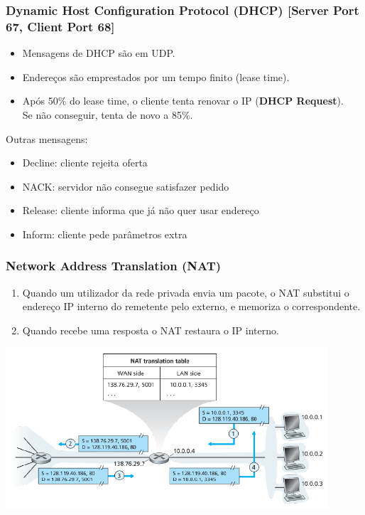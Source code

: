 \documentclass[12pt]{article}
\begin{document}
\subsubsection*{Dynamic Host Configuration Protocol (DHCP) [Server Port 67, Client Port 68]}

\begin{itemize}
    \item Mensagens de DHCP são em UDP.
    \item Endereços são emprestados por um tempo finito (lease time).
    \item Após 50\% do lease time, o cliente tenta renovar o IP (\textbf{DHCP Request}). \\
        Se não conseguir, tenta de novo a 85\%.
\end{itemize}

Outras mensagens:

\begin{itemize}[topsep=0pt, itemsep=0pt]
    \item Decline: cliente rejeita oferta
    \item NACK: servidor não consegue satisfazer pedido
    \item Release: cliente informa que já não quer usar endereço
    \item Inform: cliente pede parâmetros extra
\end{itemize}

\subsubsection*{Network Address Translation (NAT)}

\begin{enumerate}
    \item Quando um utilizador da rede privada envia um pacote, o NAT substitui o endereço IP interno do remetente pelo externo, e memoriza o correspondente.
    \item Quando recebe uma resposta o NAT restaura o IP interno.
\end{enumerate}

\includegraphics[width=0.9\textwidth]{NAT}
\end{document}
